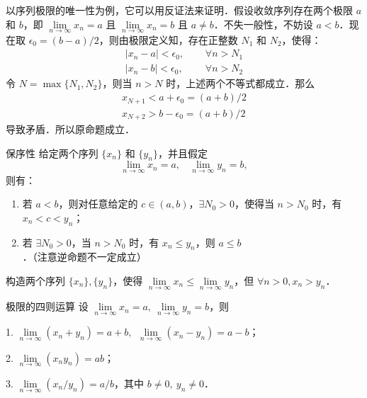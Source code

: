 以序列极限的唯一性为例，它可以用反证法来证明．假设收敛序列存在两个极限 $a$ 和 $b$，即 $\lim\limits_{n\rightarrow \infty}x_n=a$ 且 $\lim\limits_{n\rightarrow \infty} x_n=b$ 且 $a\neq b$．不失一般性，不妨设 $a<b$．现在取 $\epsilon_0=(b-a)/2$，则由极限定义知，存在正整数 $N_1$ 和 $N_2$，使得：
\begin{equation}
  \begin{aligned}
  |x_n-a|<\epsilon_0,\ \ \ \ \ \  &\forall n>N_1\\
  |x_n-b|<\epsilon_0,\ \ \ \ \ \  &\forall n>N_2
  \end{aligned}
\end{equation}
  令 $N=\max\{N_1,N_2\}$，则当 $n>N$ 时，上述两个不等式都成立．那么
\begin{equation}
\begin{aligned}
  x_{N+1} <a+\epsilon_0=(a+b)/2\\
  x_{N+2} >b-\epsilon_0=(a+b)/2
\end{aligned}
\end{equation}
  导致矛盾．所以原命题成立．

\begin{theorem}{保序性}
给定两个序列 $\{x_n\}$ 和 $\{y_n\}$，并且假定
\begin{equation}
  \lim\limits_{n\rightarrow \infty} x_n=a,\ \ \ \ \lim\limits_{n\rightarrow \infty} y_n = b,
\end{equation}
  则有：
\begin{enumerate}
\item  若 $a<b$，则对任意给定的 $c\in (a,b)$，$\exists N_0>0$，使得当 $n>N_0$ 时，有 $x_n<c<y_n$；
\item  若 $\exists N_0>0$，当 $n>N_0$ 时，有 $x_n\leq y_n$，则 $a\leq b$．（注意逆命题不一定成立）
\end{enumerate}
\end{theorem}

\begin{exercise}{}

  构造两个序列 $\{x_n\},\{y_n\}$，使得 $\lim\limits_{n\rightarrow \infty}x_n\le \lim\limits_{n\rightarrow \infty} y_n$，但 $\forall n>0,x_n>y_n$．
\end{exercise}
\begin{theorem}{极限的四则运算}
  设 $\lim\limits_{n\rightarrow \infty} x_n=a,\ \lim\limits_{n\rightarrow \infty} y_n=b$，则

  1. $\lim\limits_{n\rightarrow \infty}(x_n+y_n)=a+b,\ \ \lim\limits_{n\rightarrow \infty}(x_n-y_n)=a-b$；

  2. $\lim\limits_{n\rightarrow \infty}(x_ny_n)=ab$；

  3. $\lim\limits_{n\rightarrow \infty}(x_n/y_n)=a/b$，其中 $b\neq 0,\ y_n\neq 0$．

\end{theorem}

